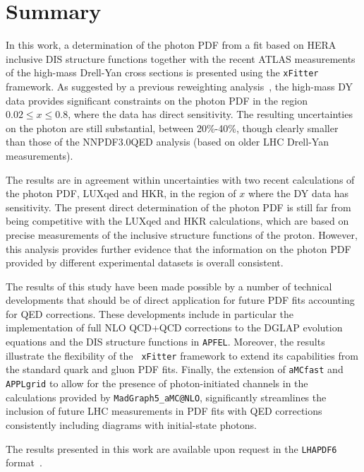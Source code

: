 \section{Summary}
\label{sec:conclusions}

%
In this work, a determination of the photon PDF from
a fit based on HERA inclusive DIS structure functions together with
the recent ATLAS measurements of the high-mass Drell-Yan cross
sections is presented using the {\tt xFitter} framework.
%
As suggested by a previous reweighting analysis~\cite{}, the
high-mass DY data provides significant constraints on the photon PDF
in the region $0.02 \le x \le 0.8$, where the data has direct
sensitivity.
%
The resulting uncertainties on the photon are still substantial,
between 20\%-40\%, though clearly smaller than those of the
NNPDF3.0QED analysis (based on older LHC Drell-Yan measurements).

The results are in agreement within uncertainties with two recent
calculations of the photon PDF, LUXqed and HKR, in the region of $x$
where the DY data has sensitivity.
%
The present direct determination of the
photon PDF is still far from being competitive with the LUXqed and HKR
calculations, which are based on precise measurements of the inclusive
structure functions of the proton.
%
However, this analysis provides further evidence that the information
on the photon PDF provided by different experimental datasets is
overall consistent.

The results of this study have been made possible by a number of
technical developments that should be of direct application for future
PDF fits accounting for QED corrections.
%
These developments include in particular the implementation of full NLO
QCD+QCD corrections to the DGLAP evolution equations and the DIS
structure functions in {\tt APFEL}.
%
Moreover, the results illustrate the flexibility of the {\tt
  xFitter} framework to extend its capabilities from the standard
quark and gluon PDF fits.
%
Finally, the extension of {\tt aMCfast} and {\tt APPLgrid} to allow
for the presence of photon-initiated channels in the calculations
provided by {\tt MadGraph5\_aMC@NLO}, significantly streamlines the
inclusion of future LHC measurements in PDF fits with QED corrections
consistently including diagrams with initial-state photons.

The results presented in this work are available upon
request in the {\tt LHAPDF6} format~\cite{Buckley:2014ana}.\\

